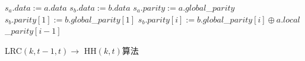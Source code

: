\begin{algorithm}[htbp]
	\begin{algorithmic}[1]
		\setlength{\commentindent}{.3\textwidth}
		\setlength{\algorithmicindent}{1.5em}
		\renewcommand{\algorithmiccomment}[1]{\unskip\hfill\makebox[\commentindent][l]{$\rhd$~#1}\par}
		\LetLtxMacro{\oldalgorithmic}{\algorithmic}
		\renewcommand{\algorithmic}[1][0]{
			\oldalgorithmic[#1]
			\renewcommand{\ALC@com}[1]{
				\IFnum\pdfstrcmp{##1}{default}=0\ELSE\algorithmiccomment{##1}\fi}%
		}
        \STATE $s_a.data := a.data$
        \STATE $s_b.data := b.data$
        \STATE $s_a.parity := a.global$\_$parity$
        \STATE $s_b.parity[1] := b.global$\_$parity[1]$
        \STATE $s_b.parity[i] := b.global$\_$parity[i] \oplus a.local$\_$parity[i-1]$
        \ENDFOR
	\end{algorithmic}
	\caption{LRC$(k,t-1,t)\rightarrow $ HH$(k,t)$算法}
	\label{alg:4-2}
\end{algorithm}